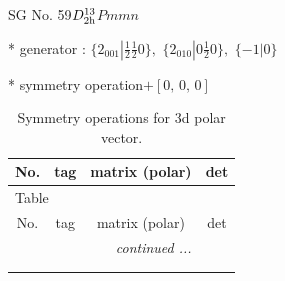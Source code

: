 \documentclass[fleqn,8pt]{jsarticle}
\begin{document}
\setcounter{MaxMatrixCols}{32}

\renewcommand{\tablename}{Table~}
\renewcommand{\figurename}{Figure~}
\begin{center}
\LARGE
SG No. 59\quad$D_{\rm 2h}^{13}$\quad$Pmmn$\quad[ orthorhombic ]
\end{center}

* generator : $\{2{}_{001}|\frac{1}{2} \frac{1}{2} 0\},\,\,\{2{}_{010}|0 \frac{1}{2} 0\},\,\,\{-1|0\}$

* symmetry operation\quad$+\left[ 0,\, 0,\, 0 \right]$
\renewcommand{\arraystretch}{1.3}
\begin{longtable}{cccc}
\caption{Symmetry operations for 3d polar vector.}
 \\
 \hline \hline
No. & tag & matrix (polar) & det \\ \hline \endfirsthead

\multicolumn{3}{l}{\tablename\ \thetable{}} \\
 \hline \hline
No. & tag & matrix (polar) & det \\ \hline \endhead

 \hline \hline
\multicolumn{3}{r}{\footnotesize\it continued ...} \\ \endfoot

 \hline \hline
\multicolumn{3}{r}{} \\ \endlastfoot


\end{longtable}
\end{document}
